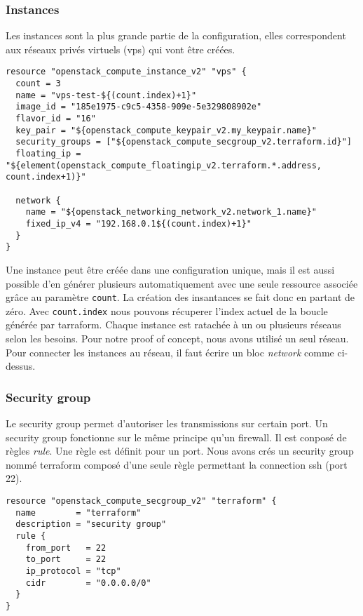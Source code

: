 \documentclass[]{article}
\begin{document}
\subsubsection{Instances}\label{instances}

Les instances sont la plus grande partie de la configuration, elles
correspondent aux réseaux privés virtuels (vps) qui vont être créées.

\begin{verbatim}
resource "openstack_compute_instance_v2" "vps" {
  count = 3
  name = "vps-test-${(count.index)+1}"
  image_id = "185e1975-c9c5-4358-909e-5e329808902e"
  flavor_id = "16"
  key_pair = "${openstack_compute_keypair_v2.my_keypair.name}"
  security_groups = ["${openstack_compute_secgroup_v2.terraform.id}"]
  floating_ip = "${element(openstack_compute_floatingip_v2.terraform.*.address, count.index+1)}"

  network {
    name = "${openstack_networking_network_v2.network_1.name}"
    fixed_ip_v4 = "192.168.0.1${(count.index)+1}"
  }
}
\end{verbatim}

Une instance peut être créée dans une configuration unique, mais il est
aussi possible d'en générer plusieurs automatiquement avec une seule
ressource associée grâce au paramètre \texttt{count}. La création des
insantances se fait donc en partant de zéro. Avec \texttt{count.index}
nous pouvons récuperer l'index actuel de la boucle générée par
tarraform. Chaque instance est ratachée à un ou plusieurs réseaus selon
les besoins. Pour notre proof of concept, nous avons utilisé un seul
réseau. Pour connecter les instances au réseau, il faut écrire un bloc
\emph{network} comme ci-dessus.

\subsubsection{Security group}\label{security-group}

Le security group permet d'autoriser les transmissions sur certain port.
Un security group fonctionne sur le même principe qu'un firewall. Il est
conposé de règles \emph{rule}. Une règle est définit pour un port. Nous
avons crés un security group nommé \og terraform \fg composé d'une seule
règle permettant la connection ssh (port 22).

\begin{verbatim}
resource "openstack_compute_secgroup_v2" "terraform" {
  name        = "terraform"
  description = "security group"
  rule {
    from_port   = 22
    to_port     = 22
    ip_protocol = "tcp"
    cidr        = "0.0.0.0/0"
  }
}
\end{verbatim}
\end{document}
